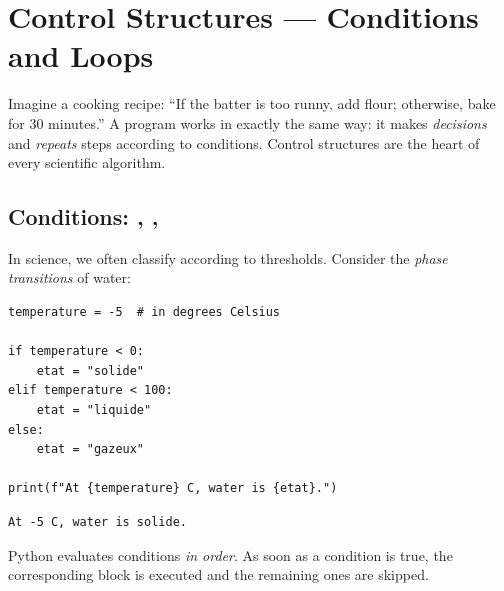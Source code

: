 \chapter{Control Structures --- Conditions and Loops}
\label{ch:controle}

\begin{intuition}
Imagine a cooking recipe: ``If the batter is too runny, add flour;
otherwise, bake for 30 minutes.'' A program works in exactly the same
way: it makes \emph{decisions} and \emph{repeats} steps according to conditions.
Control structures are the heart of every scientific algorithm.
\end{intuition}

\section{Conditions: , , }

In science, we often classify according to thresholds. Consider the
\emph{phase transitions} of water:

\begin{codeblock}[title=\textbf{Python}]
\begin{verbatim}
temperature = -5  # in degrees Celsius

if temperature < 0:
    etat = "solide"
elif temperature < 100:
    etat = "liquide"
else:
    etat = "gazeux"

print(f"At {temperature} C, water is {etat}.")
\end{verbatim}
\end{codeblock}

\begin{codeoutput}
\begin{verbatim}
At -5 C, water is solide.
\end{verbatim}
\end{codeoutput}

\begin{remark}
Python evaluates conditions \emph{in order}. As soon as a condition is true,
the corresponding block is executed and the remaining ones are skipped.
\end{remark}

